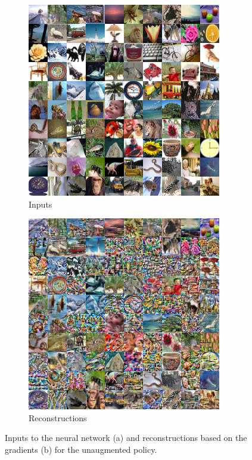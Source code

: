 \begin{figure}[hbt!]
\begin{subfigure}{.49\linewidth}\centering
\includegraphics[width=\textwidth]{grids/data_cifar100_arch_ResNet20-4_epoch_200_optim_inversed_mode_normal_auglist__rlabel_False_ORIGINALS.png}
\caption{Inputs}%
\end{subfigure}%
\hfill
\begin{subfigure}{.49\linewidth}\centering
\includegraphics[width=\textwidth]{grids/data_cifar100_arch_ResNet20-4_epoch_200_optim_inversed_mode_normal_auglist__rlabel_False_RECONSTRUCTIONS.png}
\caption{Reconstructions}%
\end{subfigure}%
\caption{Inputs to the neural network (a) and reconstructions based on the gradients (b) for the unaugmented policy.}
    \label{fig:apprr1}
\end{figure}


